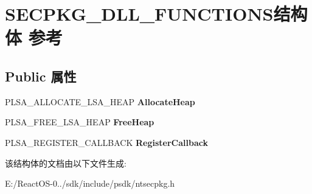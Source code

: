 \hypertarget{struct_s_e_c_p_k_g___d_l_l___f_u_n_c_t_i_o_n_s}{}\section{S\+E\+C\+P\+K\+G\+\_\+\+D\+L\+L\+\_\+\+F\+U\+N\+C\+T\+I\+O\+N\+S结构体 参考}
\label{struct_s_e_c_p_k_g___d_l_l___f_u_n_c_t_i_o_n_s}
\subsection*{Public 属性}
\begin{DoxyCompactItemize}
\item 
\mbox{\label{struct_s_e_c_p_k_g___d_l_l___f_u_n_c_t_i_o_n_s_acb27703751591b8f392fab2b2f622363}} 
P\+L\+S\+A\+\_\+\+A\+L\+L\+O\+C\+A\+T\+E\+\_\+\+L\+S\+A\+\_\+\+H\+E\+AP {\bfseries Allocate\+Heap}
\item 
\mbox{\label{struct_s_e_c_p_k_g___d_l_l___f_u_n_c_t_i_o_n_s_a6d4fd7f21fe4d74f7e8635bcde0e68af}} 
P\+L\+S\+A\+\_\+\+F\+R\+E\+E\+\_\+\+L\+S\+A\+\_\+\+H\+E\+AP {\bfseries Free\+Heap}
\item 
\mbox{\label{struct_s_e_c_p_k_g___d_l_l___f_u_n_c_t_i_o_n_s_a446aff63ce253a689c960862a1f22c0b}} 
P\+L\+S\+A\+\_\+\+R\+E\+G\+I\+S\+T\+E\+R\+\_\+\+C\+A\+L\+L\+B\+A\+CK {\bfseries Register\+Callback}
\end{DoxyCompactItemize}


该结构体的文档由以下文件生成\+:\begin{DoxyCompactItemize}
\item 
E\+:/\+React\+O\+S-\/0../sdk/include/psdk/ntsecpkg.\+h\end{DoxyCompactItemize}
